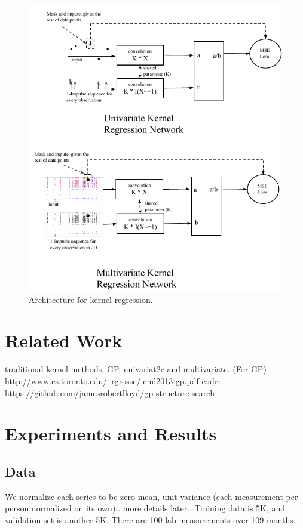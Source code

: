 \documentclass{article} %
\begin{document}
\begin{figure}[h]
\begin{center}
\includegraphics[width=\textwidth]{img/kernel_regression_images-crop.pdf}
\end{center}
\caption{Architecture for kernel regression.}\label{fig:arch}
\end{figure}

\section{Related Work}
traditional kernel methods, GP, univariat2e and multivariate.
(For GP)
http://www.cs.toronto.edu/~rgrosse/icml2013-gp.pdf
code: https://github.com/jamesrobertlloyd/gp-structure-search



\section{Experiments and Results}
\subsection{Data}
We normalize each series to be zero mean, unit variance (each measurement per person normalized on its own).. more details later..
Training data is 5K, and validation set is another 5K. There are 100 lab measurements over 109 months. 
\end{document}
